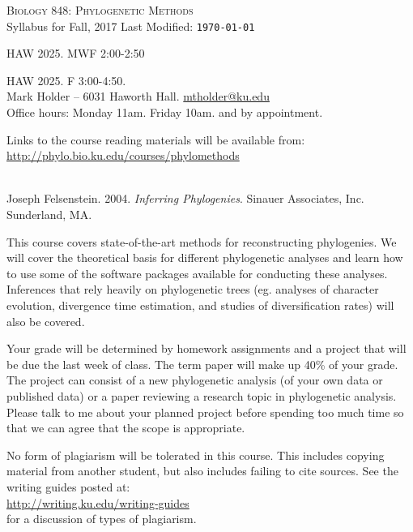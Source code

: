\documentclass[11pt]{article}
\begin{document}
{\center
\Large
\textsc{Biology 848: Phylogenetic Methods}\\
\vskip 1cm
\large Syllabus for Fall, 2017 \hskip 6cm Last Modified: {\tt  \today}
}


\vskip 1cm
\par HAW 2025. MWF 2:00-2:50\\
\par HAW 2025. F 3:00-4:50.\\

\vskip 2mm
\noindent Mark Holder -- 6031 Haworth Hall.  \href{mailto:mtholder@ku.edu}{mtholder@ku.edu}\\
Office hours:  Monday 11am. Friday 10am. and by appointment.

\vskip 2mm
\par
	Links to the course reading materials will be available from:\\ \url{http://phylo.bio.ku.edu/courses/phylomethods}

\vskip 2mm
\\
Joseph Felsenstein. 2004. {\it Inferring Phylogenies}. Sinauer Associates, Inc. Sunderland, MA.\par

\vskip 2mm
This course covers state-of-the-art methods for reconstructing phylogenies. We will cover the theoretical basis for different phylogenetic analyses and learn how to use some of the software packages available for conducting these analyses. Inferences that rely heavily on phylogenetic trees (eg. analyses of character evolution, divergence time estimation, and studies of diversification rates) will also be covered.

\vskip 2mm\par
Your grade will be determined by homework assignments and a project that will be due the last week of class.
The term paper will make up 40\% of your grade.
The project can consist of a new phylogenetic analysis (of your own data or published data) or a paper reviewing a research topic in phylogenetic analysis. 
Please talk to me about your planned project before spending too much time so that we can agree that the scope is appropriate.

\vskip 2mm
\par
No form of plagiarism will be tolerated in this course.
This includes copying material from another student, but also includes failing to cite sources.
See the writing guides posted at:\\
\url{http://writing.ku.edu/writing-guides}\\
for a discussion of types of plagiarism. 
\end{document}
